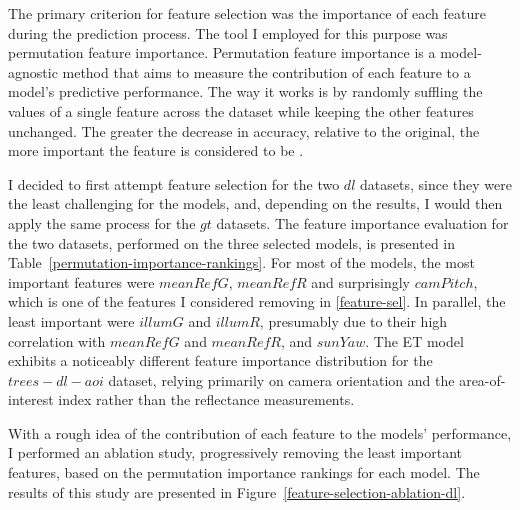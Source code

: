 The primary criterion for feature selection was the importance of each feature during the prediction process. The tool I employed for this purpose was permutation feature importance. Permutation feature importance is a model-agnostic method that aims to measure the contribution of each feature to a model's predictive performance. The way it works is by randomly suffling the values of a single feature across the dataset while keeping the other features unchanged. The greater the decrease in accuracy, relative to the original, the more important the feature is considered to be \cite{sklearn_permutation_importance}.

I decided to first attempt feature selection for the two $dl$ datasets, since they were the least challenging for the models, and, depending on the results, I would then apply the same process for the $gt$ datasets. The feature importance evaluation for the two datasets, performed on the three selected models, is presented in Table~\ref{permutation-importance-rankings}. For most of the models, the most important features were $meanRefG$, $meanRefR$ and surprisingly $camPitch$, which is one of the features I considered removing in \ref{feature-sel}. In parallel, the least important were $illumG$ and $illumR$, presumably due to their high correlation with $meanRefG$ and $meanRefR$, and $sunYaw$. The ET model exhibits a noticeably different feature importance distribution for the $trees-dl-aoi$ dataset, relying primarily on camera orientation and the area-of-interest index rather than the reflectance measurements.

With a rough idea of the contribution of each feature to the models' performance, I performed an ablation study, progressively removing the least important features, based on the permutation importance rankings for each model. The results of this study are presented in Figure~\ref{feature-selection-ablation-dl}. 


